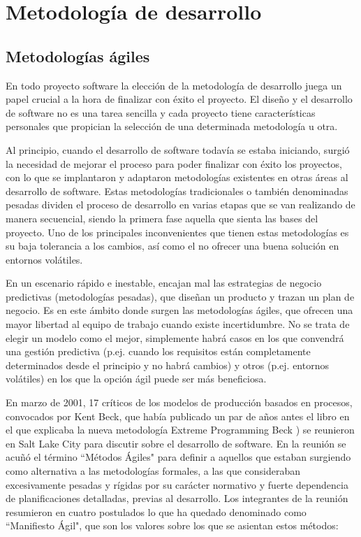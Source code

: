 \section{Metodología de desarrollo} \label{metodologia}

\subsection{Metodologías ágiles}
En todo proyecto software la elección de la metodología de desarrollo juega un papel crucial a la hora de finalizar con éxito el proyecto. El diseño y el desarrollo de software no es una tarea sencilla y cada proyecto tiene características personales que propician la selección de una determinada metodología u otra.

Al principio, cuando el desarrollo de software todavía se estaba iniciando, surgió la necesidad de mejorar el proceso para poder finalizar con éxito los proyectos, con lo que se implantaron y adaptaron metodologías existentes en otras áreas al desarrollo de software. Estas metodologías tradicionales o también denominadas pesadas dividen el proceso de desarrollo en varias etapas que se van realizando de manera secuencial, siendo la primera fase aquella que sienta las bases del proyecto. Uno de los principales inconvenientes que tienen estas metodologías es su baja tolerancia a los cambios, así como el no ofrecer una buena solución en entornos volátiles.

En un escenario rápido e inestable, encajan mal las estrategias de negocio predictivas (metodologías pesadas), que diseñan un producto y trazan un plan de negocio. Es en este ámbito donde surgen las metodologías ágiles, que ofrecen una mayor libertad al equipo de trabajo cuando existe incertidumbre. No se trata de elegir un modelo como el mejor, simplemente habrá casos en los que convendrá una gestión predictiva (p.ej. cuando los requisitos están completamente determinados desde el principio y no habrá cambios) y otros (p.ej. entornos volátiles) en los que la opción ágil puede ser más beneficiosa.

En marzo de 2001, 17 críticos de los modelos de producción basados en procesos, convocados por Kent Beck, que había publicado un par de años antes el libro en el que explicaba la nueva metodología Extreme Programming Beck \cite{kent}) se reunieron en Salt Lake City para discutir sobre el desarrollo de software. En la reunión se acuñó el término ``Métodos Ágiles" para definir a aquellos que estaban surgiendo como alternativa a las metodologías formales, a las que consideraban excesivamente pesadas y rígidas por su carácter normativo y fuerte dependencia de planificaciones detalladas, previas al desarrollo. Los integrantes de la reunión resumieron en cuatro postulados lo que ha quedado denominado como ``Manifiesto Ágil", que son los valores sobre los que se asientan estos métodos:

